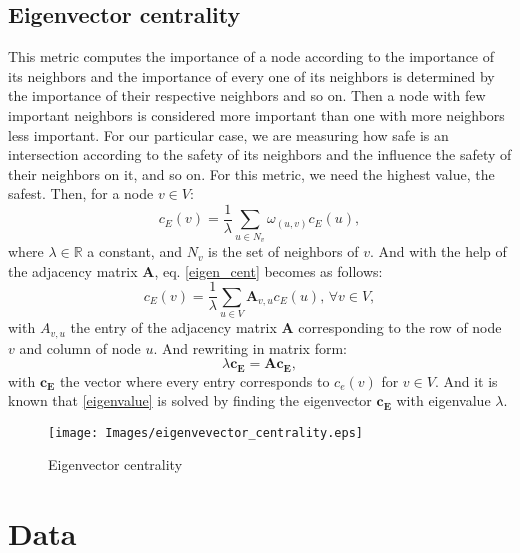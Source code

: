 \documentclass[letterpaper, 10 pt, conference]{ieeeconf}  %
\begin{document}
\subsection{Eigenvector centrality}
This metric computes the importance of a node according to the importance of its neighbors and the importance of every one of its neighbors is determined by the importance of their respective neighbors and so on. Then a node with few important neighbors is considered more important than one with more neighbors less important. For our particular case, we are measuring how safe is an intersection according to the safety of its neighbors and the influence the safety of their neighbors on it, and so on. For this metric, we need the highest value, the safest. Then, for a node $v \in V$:
\begin{equation}
\label{eigen_cent}
    c_{E}(v) = \frac{1}{\lambda} \sum_{u \in N_{v}} \omega_{(u,v)}c_{E}(u),
\end{equation}
where $\lambda \in \mathbb{R}$ a constant, and $N_{v}$ is the set of neighbors of $v$. And with the help of the adjacency matrix $\mathbf{A}$, eq. \ref{eigen_cent} becomes as follows:
\begin{equation}
    c_{E}(v) = \frac{1}{\lambda} \sum_{u \in V} \mathbf{A}_{v,u} c_{E}(u), \, \forall v \in V,
\end{equation}
with $A_{v,u}$ the entry of the adjacency matrix $\mathbf{A}$ corresponding to the row of node $v$ and column of node $u$. And rewriting in matrix form:
\begin{equation}
\label{eigenvalue}
    \lambda \mathbf{c_{E}} = \mathbf{A} \mathbf{c_{E}},
\end{equation}
with $\mathbf{c_{E}}$ the vector where every entry corresponds to $c_{e}(v)$ for $v \in V$. And it is known that \ref{eigenvalue} is solved by finding the eigenvector $\mathbf{c_{E}}$ with eigenvalue $\lambda$. 
\begin{figure}
    \centering
    \texttt{[image: Images/eigenvevector\_centrality.eps]}
    \caption{Eigenvector centrality}
    \label{Eigenvector_centrality}
\end{figure}

\section{Data}
\end{document}
